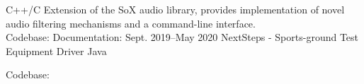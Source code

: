 \documentclass[]{cv-style}     %
\begin{document}
\begin{minipage}[b]{1.4\textwidth}
\begin{entrylist}
{C++/C}
{
Extension of the SoX audio library, provides implementation of novel audio filtering mechanisms and a command-line interface.\\
Codebase:  Documentation: 
} 
\vspace{0.1cm}
\entry
{Sept. 2019--May 2020}
{NextSteps - Sports-ground Test Equipment Driver}
{Java}
{
Codebase: 


}
\end{entrylist}
  \vspace{0.2cm}
\end{minipage}


\end{document}
